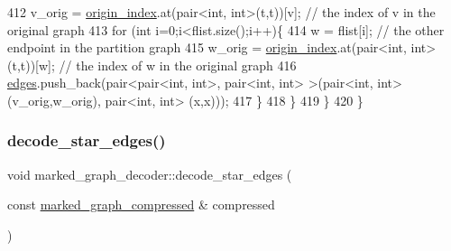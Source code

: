 \begin{DoxyCode}
412       v\_orig = \hyperlink{classmarked__graph__decoder_aab3e2f6d4376ba96da32f25aa9ddd069}{origin\_index}.at(pair<int, int>(t,t))[v]; \textcolor{comment}{// the index of v in the original graph
       }
413       \textcolor{keywordflow}{for} (\textcolor{keywordtype}{int} i=0;i<flist.size();i++)\{
414         w = flist[i]; \textcolor{comment}{// the other endpoint in the partition graph}
415         w\_orig = \hyperlink{classmarked__graph__decoder_aab3e2f6d4376ba96da32f25aa9ddd069}{origin\_index}.at(pair<int, int>(t,t))[w]; \textcolor{comment}{// the index of w in the original
       graph}
416         \hyperlink{classmarked__graph__decoder_af9e75da0a495d9c3bdcd169e15e3261e}{edges}.push\_back(pair<pair<int, int>, pair<int, int> >(pair<int, int>(v\_orig,w\_orig), pair<int,
       int> (x,x)));
417       \}
418     \}
419   \}
420 \}
\end{DoxyCode}
\mbox{\label{classmarked__graph__decoder_a79fcfb8d5616c691114ebc0a7adb18b2}} 
\subsubsection{\texorpdfstring{decode\+\_\+star\+\_\+edges()}{decode\_star\_edges()}}
{\footnotesize\ttfamily void marked\+\_\+graph\+\_\+decoder\+::decode\+\_\+star\+\_\+edges (\begin{DoxyParamCaption}\item[{const \hyperlink{classmarked__graph__compressed}{marked\+\_\+graph\+\_\+compressed} \&}]{compressed }\end{DoxyParamCaption})\hspace{0.3cm}{\ttfamily [private]}}


